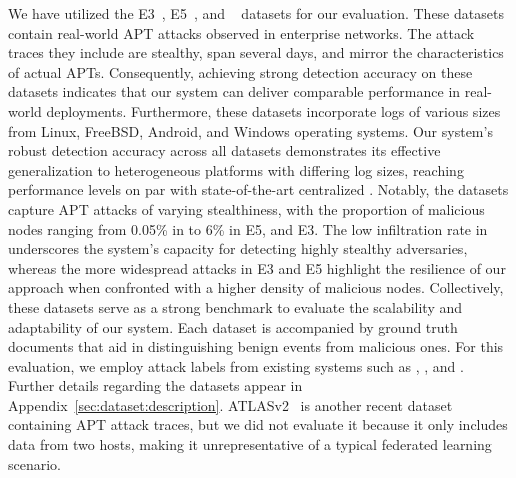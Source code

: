  We have utilized the \darpa E3~\cite{error3}, E5~\cite{bug5}, and \optc~\cite{darpaoptc} datasets for our evaluation. These datasets contain real-world APT attacks observed in enterprise networks. The attack traces they include are stealthy, span several days, and mirror the characteristics of actual APTs. Consequently, achieving strong detection accuracy on these datasets indicates that our system can deliver comparable performance in real-world deployments. Furthermore, these datasets incorporate logs of various sizes from Linux, FreeBSD, Android, and Windows operating systems. Our system’s robust detection accuracy across all datasets demonstrates its effective generalization to heterogeneous platforms with differing log sizes, reaching performance levels on par with state-of-the-art centralized \pids. Notably, the datasets capture APT attacks of varying stealthiness, with the proportion of malicious nodes ranging from 0.05\% in \optc to 6\% in E5, and E3. The low infiltration rate in \optc underscores the system’s capacity for detecting highly stealthy adversaries, whereas the more widespread attacks in E3 and E5 highlight the resilience of our approach when confronted with a higher density of malicious nodes. Collectively, these datasets serve as a strong benchmark to evaluate the scalability and adaptability of our system. Each \darpa dataset is accompanied by ground truth documents that aid in distinguishing benign events from malicious ones. For this evaluation, we employ attack labels from existing systems such as \threatrace, \kairos, and \flash. Further details regarding the datasets appear in Appendix~\ref{sec:dataset:description}. ATLASv2~\cite{riddle2023atlasv2} is another recent dataset containing APT attack traces, but we did not evaluate it because it only includes data from two hosts, making it unrepresentative of a typical federated learning scenario.

